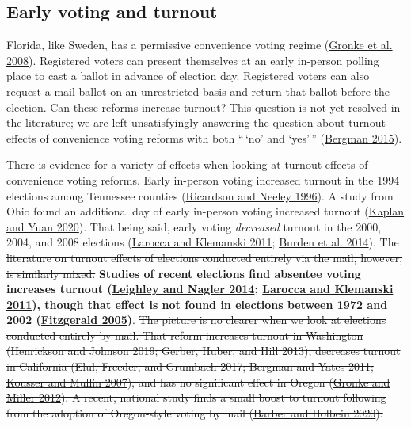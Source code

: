 \documentclass[
  12pt,
]{article}
\begin{document}
\hypertarget{early-voting-and-turnout}{%
\subsection*{Early voting and turnout}\label{early-voting-and-turnout}}

Florida, like Sweden, has a permissive convenience voting regime (\protect\hyperlink{ref-Gronke2008}{Gronke et al. 2008}). Registered voters can present themselves at an early in-person polling place to cast a ballot in advance of election day. Registered voters can also request a mail ballot on an unrestricted basis and return that ballot before the election. Can these reforms increase turnout? This question is not yet resolved in the literature; we are left unsatisfyingly answering the question about turnout effects of convenience voting reforms with both ``\,`no' and `yes'\,'' (\protect\hyperlink{ref-Bergman2015}{Bergman 2015}).

There is evidence for a variety of effects when looking at turnout effects of convenience voting reforms. Early in-person voting increased turnout in the 1994 elections among Tennessee counties (\protect\hyperlink{ref-Ricardson1996}{Ricardson and Neeley 1996}). A study from Ohio found an additional day of early in-person voting increased turnout (\protect\hyperlink{ref-Kaplan2020}{Kaplan and Yuan 2020}). That being said, early voting \emph{decreased} turnout in the 2000, 2004, and 2008 elections (\protect\hyperlink{ref-Larocca2011}{Larocca and Klemanski 2011}; \protect\hyperlink{ref-Burden2014}{Burden et al. 2014}). \sout{The literature on turnout effects of elections conducted entirely via the mail, however, is similarly mixed.} \textbf{Studies of recent elections find absentee voting increases turnout (\protect\hyperlink{ref-Leighley2014}{Leighley and Nagler 2014}; \protect\hyperlink{ref-Larocca2011}{Larocca and Klemanski 2011}), though that effect is not found in elections between 1972 and 2002 (\protect\hyperlink{ref-Fitzgerald2005}{Fitzgerald 2005})}. \sout{The picture is no clearer when we look at elections conducted entirely by mail. That reform increases turnout in Washington (\protect\hyperlink{ref-Henrickson2019}{Henrickson and Johnson 2019}; \protect\hyperlink{ref-Gerber2013}{Gerber, Huber, and Hill 2013}), decreases turnout in California (\protect\hyperlink{ref-Elul2017}{Elul, Freeder, and Grumbach 2017}; \protect\hyperlink{ref-Bergman2011}{Bergman and Yates 2011}; \protect\hyperlink{ref-Kousser2007}{Kousser and Mullin 2007}), and has no significant effect in Oregon (\protect\hyperlink{ref-Gronke2012}{Gronke and Miller 2012}). A recent, national study finds a small boost to turnout following from the adoption of Oregon-style voting by mail (\protect\hyperlink{ref-Barber2020}{Barber and Holbein 2020}).}
\end{document}
